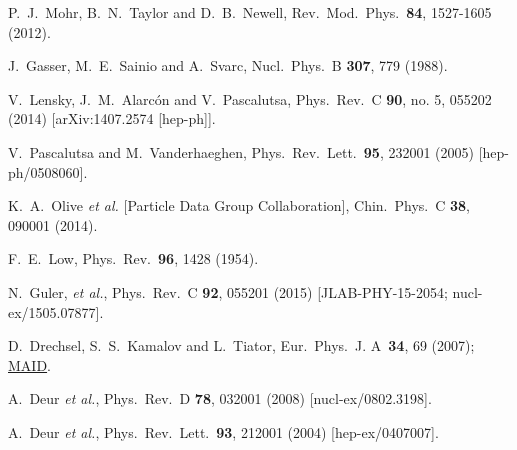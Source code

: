 \documentclass[twocolumn,prc,showpacs,nofootinbib,preprintnumbers,amsmath,amssymb,superscriptaddress]{revtex4-1}
\begin{document}
\begin{thebibliography}{99}
   
P.~J.~Mohr, B.~N.~Taylor and D.~B.~Newell,
Rev.\ Mod.\ Phys.\ {\bf 84}, 1527-1605 (2012).
   
J.~Gasser, M.~E.~Sainio and A.~Svarc,
Nucl.\ Phys.\ B {\bf 307}, 779 (1988).

  V.~Lensky, J.~M.~Alarc\'on and V.~Pascalutsa,
  Phys.\ Rev.\ C {\bf 90}, no. 5, 055202 (2014)
  [arXiv:1407.2574 [hep-ph]].
  
  V.~Pascalutsa and M.~Vanderhaeghen,
  Phys.\ Rev.\ Lett.\  {\bf 95}, 232001 (2005)
  [hep-ph/0508060].

  K.~A.~Olive {\it et al.}  [Particle Data Group Collaboration],
  Chin.\ Phys.\ C {\bf 38}, 090001 (2014).

  F.~E.~Low,
  Phys.\ Rev.\  {\bf 96}, 1428 (1954).

N.~Guler, {\it et al.}, 
Phys.\ Rev.\ C {\bf 92}, 055201 (2015) [JLAB-PHY-15-2054; nucl-ex/1505.07877].


D.~Drechsel, S.~S.~Kamalov and L.~Tiator, Eur.\ Phys.\ J. A\ {\bf 34}, 69 (2007); \href{http://www.kph.uni-mainz.de/MAID/}{MAID}.

  A.~Deur {\it et al.},
  Phys.\ Rev.\ D {\bf 78}, 032001 (2008)
  [nucl-ex/0802.3198].

  A.~Deur {\it et al.},
  Phys.\ Rev.\ Lett.\  {\bf 93}, 212001 (2004)
  [hep-ex/0407007].


\end{thebibliography}
\end{document}
